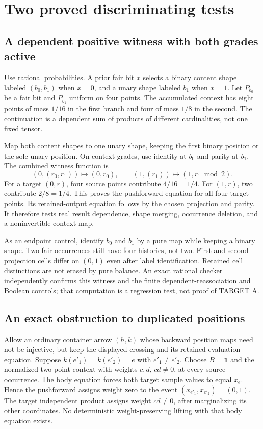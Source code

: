 \documentclass[11pt,a4paper]{article}
\newcommand{\one}{\mathbf 1}
\begin{document}
\section{Two proved discriminating tests}

\subsection{A dependent positive witness with both grades active}
Use rational probabilities. A prior fair bit $x$ selects a binary content
shape labeled $(b_0,b_1)$ when $x=0$, and a unary shape labeled $b_1$ when
$x=1$. Let $P_{b_0}$ be a fair bit and $P_{b_1}$ uniform on four points.
The accumulated context has eight points of mass $1/16$ in the first branch
and four of mass $1/8$ in the second. The continuation is a dependent sum
of products of different cardinalities, not one fixed tensor.

Map both content shapes to one unary shape, keeping the first binary
position or the sole unary position. On context grades, use identity at
$b_0$ and parity at $b_1$. The combined witness function is
\[
 (0,(r_0,r_1))\longmapsto(0,r_0),\qquad
 (1,(r_1))\longmapsto(1,r_1\bmod2).
\]
For a target $(0,r)$, four source points contribute $4/16=1/4$.
For $(1,r)$, two contribute $2/8=1/4$. This proves the pushforward equation
for all four target points. Its retained-output equation follows by the
chosen projection and parity. It therefore tests real result dependence,
shape merging, occurrence deletion, and a noninvertible context map.

As an endpoint control, identify $b_0$ and $b_1$ by a pure map while keeping
a binary shape. Two fair occurrences still have four histories, not two.
First and second projection cells differ on $(0,1)$ even after label
identification. Retained cell distinctions are not erased by pure balance.
An exact rational checker independently confirms this witness and the
finite dependent-reassociation and Boolean controls; that computation is
a regression test, not proof of TARGET A.

\subsection{An exact obstruction to duplicated positions}
Allow an ordinary container arrow $(h,k)$ whose backward position maps need
not be injective, but keep the displayed crossing and its retained-evaluation
equation. Suppose $k(e'_1)=k(e'_2)=e$ with $e'_1\ne e'_2$. Choose $B=\one$
and the normalized two-point context with weights $c,d$, $cd\ne0$, at every
source occurrence. The body equation forces both target sample values to
equal $x_e$. Hence the pushforward assigns weight zero to the event
$(x_{e'_1},x_{e'_2})=(0,1)$. The target independent product assigns weight
$cd\ne0$, after marginalizing its other coordinates. No deterministic
weight-preserving lifting with that body equation exists.
\end{document}
